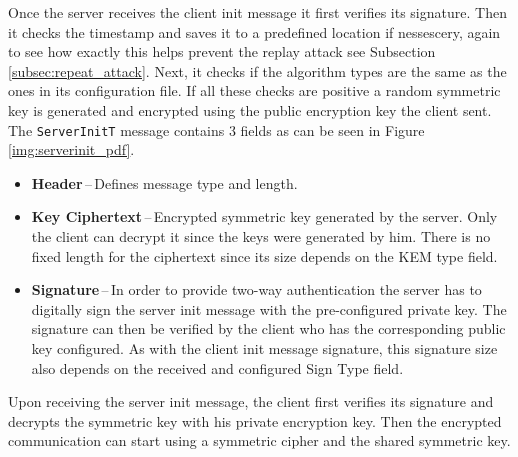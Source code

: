 Once the server receives the client init message it first verifies its signature. Then it checks the timestamp and saves it to a predefined location if nessescery, again to see how exactly this helps prevent the replay attack see Subsection \ref{subsec:repeat_attack}. Next, it checks if the algorithm types are the same as the ones in its configuration file. If all these checks are positive a random symmetric key is generated and encrypted using the public encryption key the client sent. The \texttt{ServerInitT} message contains 3 fields as can be seen in Figure \ref{img:serverinit_pdf}.
\begin{itemize}
  \item \textbf{Header}\,--\,Defines message type and length.
  \item \textbf{Key Ciphertext}\,--\,Encrypted symmetric key generated by the server. Only the client can decrypt it since the keys were generated by him. There is no fixed length for the ciphertext since its size depends on the KEM type field.
  \item \textbf{Signature}\,--\,In order to provide two-way authentication the server has to digitally sign the server init message with the pre-configured private key. The signature can then be verified by the client who has the corresponding public key configured. As with the client init message signature, this signature size also depends on the received and configured Sign Type field.
\end{itemize}

Upon receiving the server init message, the client first verifies its signature and decrypts the symmetric key with his private encryption key. Then the encrypted communication can start using a symmetric cipher and the shared symmetric key.
